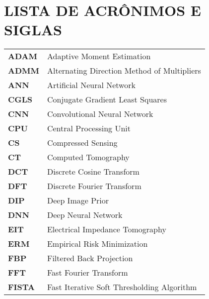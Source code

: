  \section*{\centering LISTA DE ACRÔNIMOS E SIGLAS}
\begin{flushleft}
\begin{tabular}{ l l }
\textbf{ADAM}&Adaptive Moment Estimation\\                                           \textbf{ADMM}&Alternating Direction Method of Multipliers\\                       \textbf{ANN}&Artificial Neural Network\\                                                     
\textbf{CGLS} & Conjugate Gradient Least Squares \\                                  
\textbf{CNN}&Convolutional Neural Network\\                                             
\textbf{CPU}&Central Processing Unit\\                                                       
\textbf{CS}&Compressed Sensing\\                                                             
\textbf{CT}&Computed Tomography\\                                                         
\textbf{DCT}&Discrete Cosine Transform\\                                                
\textbf{DFT}&Discrete Fourier Transform\\                                            
\textbf{DIP}&Deep Image Prior\\                                                                 
\textbf{DNN}&Deep Neural Network\\                                                         
\textbf{EIT}&Electrical Impedance Tomography\\                                        
\textbf{ERM}&Empirical Risk Minimization\\                                                 
\textbf{FBP}&Filtered Back Projection\\                                                                                                                      
\textbf{FFT}&Fast Fourier Transform\\                                                                                                                      
\textbf{FISTA}&Fast Iterative Soft Thresholding Algorithm\\                          

\end{tabular}
\end{flushleft}
